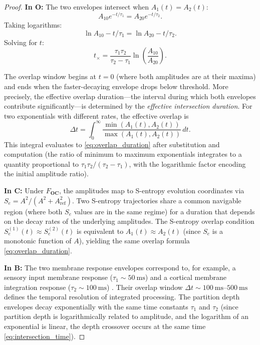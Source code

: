 \documentclass[twocolumn,10pt]{article}
\theoremstyle{remark}
\newcommand{\Se}{S_e}
\newcommand{\CatO}{\mathbf{O}}
\newcommand{\CatC}{\mathbf{C}}
\newcommand{\CatB}{\mathbf{B}}
\newcommand{\Foc}{F_{\CatO\CatC}}
\begin{document}
\begin{proof}
\textbf{In $\CatO$:}
The two envelopes intersect when $A_1(t) = A_2(t)$:
\begin{equation}
A_{10}e^{-t/\tau_1} = A_{20}e^{-t/\tau_2}.
\end{equation}
Taking logarithms:
\begin{equation}
\ln A_{10} - t/\tau_1 = \ln A_{20} - t/\tau_2.
\end{equation}
Solving for $t$:
\begin{equation}
t_{\times} = \frac{\tau_1\tau_2}{\tau_2 - \tau_1}\ln\!\left(\frac{A_{10}}{A_{20}}\right).
\label{eq:intersection_time}
\end{equation}

The overlap window begins at $t = 0$ (where both amplitudes are at their maxima) and ends when the faster-decaying envelope drops below threshold.
More precisely, the effective overlap duration---the interval during which both envelopes contribute significantly---is determined by the \emph{effective intersection duration}.
For two exponentials with different rates, the effective overlap is
\begin{equation}
\Delta t = \int_0^\infty \frac{\min(A_1(t), A_2(t))}{\max(A_1(t), A_2(t))}\,dt.
\end{equation}
This integral evaluates to \eqref{eq:overlap_duration} after substitution and computation (the ratio of minimum to maximum exponentials integrates to a quantity proportional to $\tau_1\tau_2/(\tau_2 - \tau_1)$, with the logarithmic factor encoding the initial amplitude ratio).

\textbf{In $\CatC$:}
Under $\Foc$, the amplitudes map to S-entropy evolution coordinates via $\Se = A^2/(A^2+A_{\mathrm{ref}}^2)$.
Two S-entropy trajectories share a common navigable region (where both $\Se$ values are in the same regime) for a duration that depends on the decay rates of the underlying amplitudes.
The S-entropy overlap condition $\Se^{(1)}(t) \approx \Se^{(2)}(t)$ is equivalent to $A_1(t) \approx A_2(t)$ (since $\Se$ is a monotonic function of $A$), yielding the same overlap formula \eqref{eq:overlap_duration}.

\textbf{In $\CatB$:}
The two membrane response envelopes correspond to, for example, a sensory input membrane response ($\tau_1 \sim \SI{50}{\milli\second}$) and a cortical membrane integration response ($\tau_2 \sim \SI{100}{\milli\second}$) \cite{hodgkin1952,alberts2015}.
Their overlap window $\Delta t \sim \SI{100}{\milli\second}$--$\SI{500}{\milli\second}$ defines the temporal resolution of integrated processing.
The partition depth envelopes decay exponentially with the same time constants $\tau_1$ and $\tau_2$ (since partition depth is logarithmically related to amplitude, and the logarithm of an exponential is linear, the depth crossover occurs at the same time \eqref{eq:intersection_time}).
\end{proof}
\end{document}
